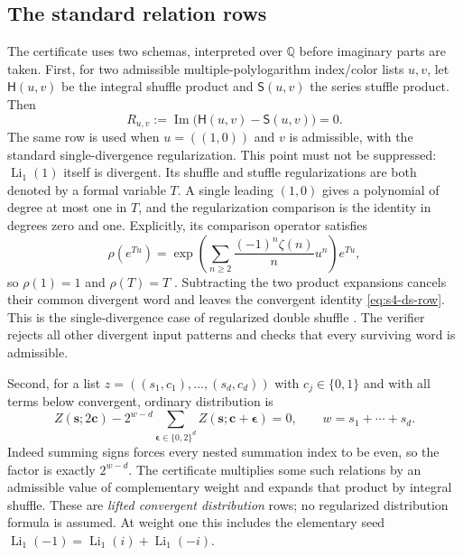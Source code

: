 \subsection{The standard relation rows}
The certificate uses two schemas, interpreted over $\mathbb Q$ before
imaginary parts are taken.
First, for two admissible multiple-polylogarithm index/color lists $u,v$,
let $\mathsf H(u,v)$ be the integral shuffle product and
$\mathsf S(u,v)$ the series stuffle product. Then
\begin{equation}\label{eq:s4-ds-row}
 R_{u,v}:=\operatorname{Im}\bigl(\mathsf H(u,v)-\mathsf S(u,v)\bigr)=0.
\end{equation}
The same row is used when $u=((1,0))$ and $v$ is admissible, with the standard
single-divergence regularization. This point must not be suppressed:
$\operatorname{Li}_1(1)$ itself is divergent. Its shuffle and stuffle
regularizations are both denoted by a formal variable $T$. A single leading
$(1,0)$ gives a polynomial of degree at most one in $T$, and the
regularization comparison is the identity in degrees zero and one.
Explicitly, its comparison operator satisfies
\[
 \rho(e^{Tu})=\exp\!\left(\sum_{n\ge2}\frac{(-1)^n\zeta(n)}n u^n\right)e^{Tu},
\]
so $\rho(1)=1$ and $\rho(T)=T$ \cite[Theorem~2.9]{jqzhao2010}.
Subtracting the two product expansions cancels their common divergent word
and leaves the convergent identity \eqref{eq:s4-ds-row}. This is the
single-divergence case of regularized double shuffle
\cite{racinet2002,jqzhao2010}. The verifier rejects all other divergent input
patterns and checks that every surviving word is admissible.

Second, for a list $z=((s_1,c_1),\ldots,(s_d,c_d))$ with
$c_j\in\{0,1\}$ and with all terms below convergent, ordinary distribution
is
\begin{equation}\label{eq:s4-distribution-row}
 Z(\boldsymbol s;2\boldsymbol c)
 -2^{w-d}\sum_{\boldsymbol\epsilon\in\{0,2\}^d}
 Z(\boldsymbol s;\boldsymbol c+\boldsymbol\epsilon)=0,
 \qquad w=s_1+\cdots+s_d.
\end{equation}
Indeed summing signs forces every nested summation index to be even, so the
factor is exactly $2^{w-d}$. The certificate multiplies some such relations
by an admissible value of complementary weight and expands that product by
integral shuffle. These are \emph{lifted convergent distribution} rows; no
regularized distribution formula is assumed. At weight one this includes
the elementary seed $\operatorname{Li}_1(-1)=
\operatorname{Li}_1(i)+\operatorname{Li}_1(-i)$.

